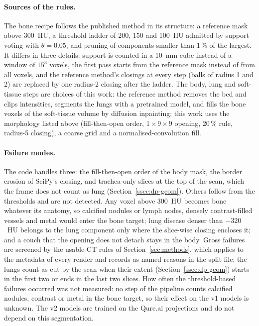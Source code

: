 \paragraph{Sources of the rules.} The bone recipe follows the published method \citep[Algorithm~1]{angaitkar2026anatomy} in its structure:
a reference mask above 300~HU, a threshold ladder of 200, 150 and 100~HU admitted by support voting with $\theta=0.05$, and pruning of
components smaller than 1\,\% of the largest. It differs in three details: support is counted in a 10~mm cube instead of a window of $15^3$
voxels, the first pass starts from the reference mask instead of from all voxels, and the reference method's closings at every step (balls of
radius 1 and 2) are replaced by one radius-2 closing after the ladder. The body, lung and soft-tissue steps are choices of this work: the
reference method removes the bed and clips intensities, segments the lungs with a pretrained model, and fills the bone voxels of the soft-tissue
volume by diffusion inpainting; this work uses the morphology listed above (fill-then-open order, $1\times9\times9$ opening, 20\,\% rule,
radius-5 closing), a coarse grid and a normalised-convolution fill.

\paragraph{Failure modes.} The code handles three: the fill-then-open order of the body mask, the border erosion of SciPy's closing, and
trachea-only slices at the top of the scan, which the frame does not count as lung (Section~\ref{ssec:dp-geom}). Others follow from the thresholds
and are not detected. Any voxel above 300~HU becomes bone whatever its anatomy, so calcified nodules or lymph nodes, densely contrast-filled vessels
and metal would enter the bone target; lung disease denser than $-320$~HU belongs to the lung component only where the slice-wise closing encloses
it; and a couch that the opening does not detach stays in the body. Gross failures are screened by the usable-CT rules of
Section~\ref{sec:methods}, which  applies to the metadata of every render and records as named reasons in the split
file; the lungs count as cut by the scan when their extent (Section~\ref{ssec:dp-geom}) starts in the first two or ends in the last two slices.
How often the threshold-based failures occurred was not measured: no step of the pipeline counts calcified nodules, contrast or metal in the
bone target, so their effect on the v1 models is unknown. The v2 models are trained on the Qure.ai projections and do not depend on this
segmentation.

